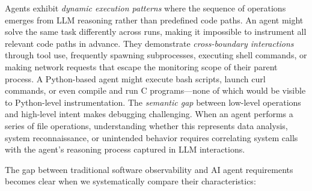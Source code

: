 Agents exhibit \emph{dynamic execution patterns} where the sequence of operations emerges from LLM reasoning rather than predefined code paths. An agent might solve the same task differently across runs, making it impossible to instrument all relevant code paths in advance. They demonstrate \emph{cross-boundary interactions} through tool use, frequently spawning subprocesses, executing shell commands, or making network requests that escape the monitoring scope of their parent process. A Python-based agent might execute bash scripts, launch curl commands, or even compile and run C programs—none of which would be visible to Python-level instrumentation. The \emph{semantic gap} between low-level operations and high-level intent makes debugging challenging. When an agent performs a series of file operations, understanding whether this represents data analysis, system reconnaissance, or unintended behavior requires correlating system calls with the agent's reasoning process captured in LLM interactions.

The gap between traditional software observability and AI agent requirements becomes clear when we systematically compare their characteristics:

